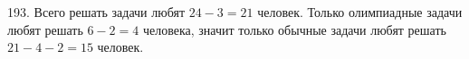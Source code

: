 193. Всего решать задачи любят $24-3=21$ человек. Только олимпиадные задачи любят решать $6-2=4$ человека, значит только обычные задачи любят решать $21-4-2=15$ человек.\\
